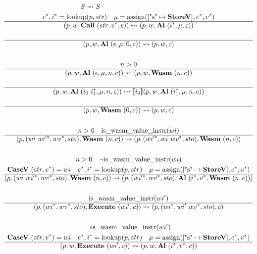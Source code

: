 \begin{gather*}
\newline \\
  S \leadsto S
%
\newline \\
  \seq e, \seq i = \lookup(p, str) \quad \mu = \assign([\text{"s"} \mapsto \storev], \seq e, \seq v) \\
  \hline
  (p, w, \call ~ (str, \seq v, c)) \leadsto (p, w, \al ~ (\seq i, \mu, c)) \\
%
\newline \\
  \hline
  (p, w, \al ~ (\epsilon, \mu, 0, c)) \leadsto (p, w, c) \\
%
\newline \\
  n > 0 \\
  \hline
  (p, w, \al ~ (\epsilon, \mu, n, c)) \leadsto (p, w, \wasm ~ (n, c)) \\
%
\newline \\
  \hline
  (p, w, \al ~ (i_0 ~ \seq{i_1}, \mu, n, c))
  \leadsto
  \sem{i_0}(p, w, \al ~ (\seq{i_1}, \mu, n, c)) \\
%
\newline \\
  \hline
  (p, w, \wasm ~ (0, c)) \leadsto (p, w, c) \\
%
\newline \\
  n > 0 \quad \iswasmvalueinstr(wi) \\
  \hline
  (p, (wi ~ \seq{wi'}, \seq{wv}, sto), \wasm ~ (n, c))
  \leadsto
  (p, (\seq{wi'}, wi ~ \seq{wv}, sto), \wasm ~ (n, c)) \\
%
\newline \\
  n > 0 \quad \neg \iswasmvalueinstr(wi) \\
  \casev ~ (str, \seq v) = wi \quad
  \seq e, \seq i = \lookup(p, str) \quad
  \mu = \assign([\text{"s"} \mapsto \storev], \seq e, \seq v) \\
  \hline
  (p, (wi ~ \seq{wi'}, \seq{wv}, sto), \wasm ~ (n, c))
  \leadsto
  (p, (\seq{wi'}, \seq{wv}, sto), \al ~ (\seq i, \seq v, \wasm ~ (n, c))) \\
%
\newline \\
  \iswasmvalueinstr(wi') \\
  \hline
  (p, (\seq{wi}, \seq{wv}, sto), \exe ~ (wi', c))
  \leadsto
  (p, (\seq{wi}, wi' ~ \seq{wv}, sto), c) \\
%
\newline \\
  \neg \iswasmvalueinstr(wi') \\
  \casev ~ (str, \seq v) = wi \quad
  \seq e, \seq i = \lookup(p, str) \quad
  \mu = \assign([\text{"s"} \mapsto \storev], \seq e, \seq v) \\
  \hline
  (p, w, \exe ~ (wi', c)) \leadsto (p, w, \al ~ (\seq i, \seq v, c)) \\
\end{gather*}




